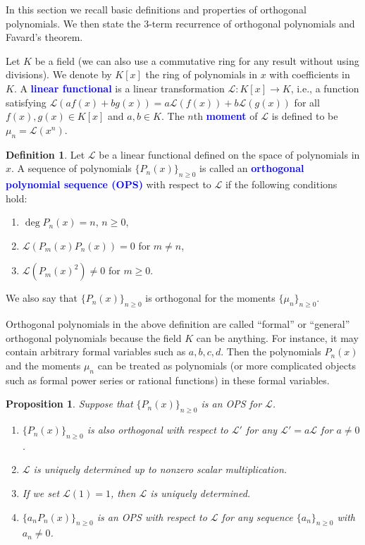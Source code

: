 \documentclass[oneside]{book}
\numberwithin{equation}{section}
\newtheorem{prop}[thm]{Proposition}
\theoremstyle{definition}
\newtheorem{defn}[thm]{Definition}
\newcommand\LL{\mathcal{L}}
\renewcommand\emph[1]{\textcolor{blue}{\bf #1}}
\begin{document}
In this section we recall basic definitions and properties of
orthogonal polynomials. We then state the 3-term recurrence of
orthogonal polynomials and Favard's theorem.

Let \( K \) be a field (we can also use a commutative ring for any
result without using divisions). We denote by \( K[x] \) the ring of
polynomials in \( x \) with coefficients in \( K \). A \emph{linear
  functional} is a linear transformation \( \LL:K[x]\to K \), i.e., a
function satisfying \( \LL(af(x)+bg(x)) = a \LL(f(x))+b \LL(g(x)) \)
for all \( f(x),g(x)\in K[x] \) and \( a,b\in K \). The \( n \)th
\emph{moment} of \( \LL \) is defined to be \( \mu_n = \LL(x^n) \).

\begin{defn}\label{def:formal-ops}
  Let \( \LL \) be a linear functional defined on the space of
  polynomials in \( x \). A sequence of polynomials
  \( \{P_n(x)\}_{n\ge0} \) is called an \emph{orthogonal polynomial
    sequence (OPS)} with respect to \( \LL \) if the following
  conditions hold:
  \begin{enumerate}
  \item \( \deg P_n(x) = n \), \( n\ge0 \),
  \item \( \LL(P_m(x)P_n(x))  = 0 \) for \( m\ne n \),
  \item \( \LL(P_m(x)^2) \ne 0 \) for \( m\ge0 \).
  \end{enumerate}
  We also say that \( \{ P_n(x) \}_{n\ge 0} \) is orthogonal
  for the moments \( \{\mu_n\}_{n\ge0} \).
\end{defn}

Orthogonal polynomials in the above definition are called ``formal''
or ``general'' orthogonal polynomials because the field \( K \) can be
anything. For instance, it may contain arbitrary formal variables such
as \( a,b,c,d \). Then the polynomials \( P_n(x) \) and the moments
\( \mu_n \) can be treated as polynomials (or more complicated objects
such as formal power series or rational functions) in these formal
variables.

\begin{prop}
  Suppose that \( \{ P_n(x) \}_{n\ge 0} \) is an OPS for \( \LL \).
\begin{enumerate}
\item \( \{ P_n(x) \}_{n\ge 0} \) is also orthogonal with respect to
  \( \LL' \) for any \( \LL' = a\LL \) for \( a\ne 0 \).
\item \( \LL \) is uniquely determined up to
  nonzero scalar multiplication. 
\item If we set \( \LL(1) = 1 \), then \( \LL \) is uniquely
  determined.
\item \( \{ a_nP_n(x) \}_{n\ge 0} \) is an OPS with respect to
  \( \LL \) for any sequence \( \{ a_n\}_{n\ge 0} \) with
  \( a_n\ne 0 \).
\end{enumerate}
\end{prop}
\end{document}
